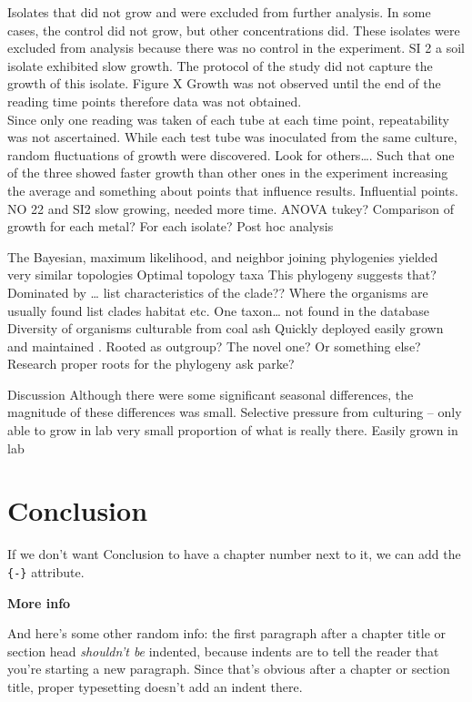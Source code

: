 \documentclass[ms]{uncgdissertationexp}
\theoremstyle{plain}
\theoremstyle{definition}
\theoremstyle{remark}
\begin{document}
  Isolates that did not grow and were excluded from further analysis. In
  some cases, the control did not grow, but other concentrations did.
  These isolates were excluded from analysis because there was no control
  in the experiment. SI 2 a soil isolate exhibited slow growth. The
  protocol of the study did not capture the growth of this isolate. Figure
  X Growth was not observed until the end of the reading time points
  therefore data was not obtained.\\
  Since only one reading was taken of each tube at each time point,
  repeatability was not ascertained. While each test tube was inoculated
  from the same culture, random fluctuations of growth were discovered.
  Look for others\ldots{}. Such that one of the three showed faster growth
  than other ones in the experiment increasing the average and something
  about points that influence results. Influential points. NO 22 and SI2
  slow growing, needed more time. ANOVA tukey? Comparison of growth for
  each metal? For each isolate? Post hoc analysis
  
  The Bayesian, maximum likelihood, and neighbor joining phylogenies
  yielded very similar topologies Optimal topology taxa This phylogeny
  suggests that? Dominated by \ldots{} list characteristics of the clade??
  Where the organisms are usually found list clades habitat etc. One
  taxon\ldots{} not found in the database Diversity of organisms
  culturable from coal ash Quickly deployed easily grown and maintained .
  Rooted as outgroup? The novel one? Or something else? Research proper
  roots for the phylogeny ask parke?
  
  Discussion Although there were some significant seasonal differences,
  the magnitude of these differences was small. Selective pressure from
  culturing -- only able to grow in lab very small proportion of what is
  really there. Easily grown in lab
  
  \chapter{Conclusion}\label{conclusion}
  
  If we don't want Conclusion to have a chapter number next to it, we can
  add the \texttt{\{-\}} attribute.
  
  \textbf{More info}
  
  And here's some other random info: the first paragraph after a chapter
  title or section head \emph{shouldn't be} indented, because indents are
  to tell the reader that you're starting a new paragraph. Since that's
  obvious after a chapter or section title, proper typesetting doesn't add
  an indent there.
  
\end{document}

